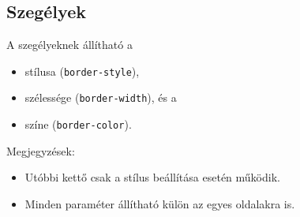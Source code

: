 \subsection{Szegélyek}

\begin{frame}
  A szegélyeknek állítható a
  \begin{itemize}
    \item stílusa (\texttt{border-style}),
    \item szélessége (\texttt{border-width}), és a 
    \item színe (\texttt{border-color}).
  \end{itemize}
  Megjegyzések:
  \begin{itemize}
    \item Utóbbi kettő csak a stílus beállítása esetén működik.
    \item Minden paraméter állítható külön az egyes oldalakra is.
  \end{itemize}
\end{frame}

